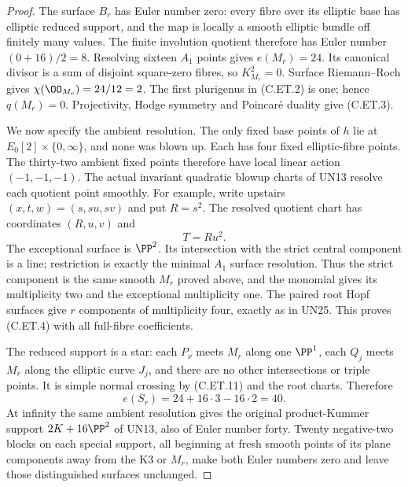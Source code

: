 \begin{proof}
The surface $B_r$ has Euler number
zero: every fibre over its elliptic
base has elliptic reduced support,
and the map is locally a smooth
elliptic bundle off finitely many
values. The finite involution
quotient therefore has Euler
number $(0+16)/2=8$. Resolving
sixteen $A_1$ points gives
$e(M_r)=24$. Its canonical
divisor is a sum of disjoint
square-zero fibres, so
$K_{M_r}^2=0$. Surface
Riemann--Roch gives
$\chi(\OO_{M_r})=24/12=2$.
The first plurigenus in (C.ET.2)
is one; hence $q(M_r)=0$.
Projectivity, Hodge symmetry and
Poincar\'e duality give (C.ET.3).

We now specify the ambient resolution.
The only fixed base points of
$h$ lie at $E_0[2]\times\{0,\infty\}$,
and none was blown up. Each has
four fixed elliptic-fibre points.
The thirty-two ambient fixed
points therefore have local
linear action $(-1,-1,-1)$.
The actual invariant quadratic
blowup charts of UN13 resolve
each quotient point smoothly.
For example, write upstairs
$(x,t,w)=(s,su,sv)$ and put
$R=s^2$. The resolved quotient
chart has coordinates $(R,u,v)$
and
\[
                              T=Ru^2 .                \tag{C.ET.11}
\]
The exceptional surface is $\PP^2$.
Its intersection with the strict
central component is a line;
restriction is exactly the
minimal $A_1$ surface resolution.
Thus the strict component is
the same smooth $M_r$ proved
above, and the monomial gives
its multiplicity two and the
exceptional multiplicity one.
The paired root Hopf surfaces
give $r$ components of
multiplicity four, exactly as
in UN25. This proves (C.ET.4)
with all full-fibre coefficients.

The reduced support is a star:
each $P_\nu$ meets $M_r$ along
one $\PP^1$, each $Q_j$ meets
$M_r$ along the elliptic curve
$J_j$, and there are no other
intersections or triple points.
It is simple normal crossing
by (C.ET.11) and the root charts.
Therefore
\[
                 e(S_r)=24+16\cdot3-16\cdot2=40.
                                                               \tag{C.ET.12}
\]
At infinity the same ambient
resolution gives the original
product-Kummer support
$2K+16\PP^2$ of UN13, also
of Euler number forty.
Twenty negative-two blocks
on each special support,
all beginning at fresh
smooth points of its plane
components away from the
K3 or $M_r$, make both
Euler numbers zero and
leave those distinguished
surfaces unchanged.


\end{proof}
